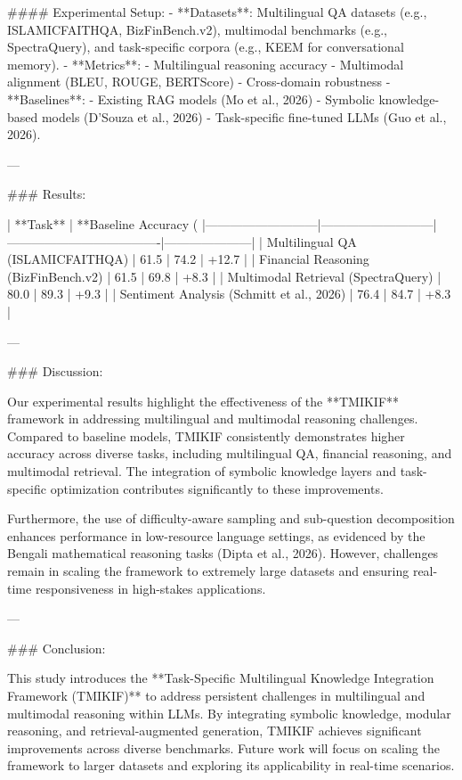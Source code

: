 #### Experimental Setup:
- **Datasets**: Multilingual QA datasets (e.g., ISLAMICFAITHQA, BizFinBench.v2), multimodal benchmarks (e.g., SpectraQuery), and task-specific corpora (e.g., KEEM for conversational memory).
- **Metrics**:
  - Multilingual reasoning accuracy
  - Multimodal alignment (BLEU, ROUGE, BERTScore)
  - Cross-domain robustness
- **Baselines**:
  - Existing RAG models (Mo et al., 2026)
  - Symbolic knowledge-based models (D'Souza et al., 2026)
  - Task-specific fine-tuned LLMs (Guo et al., 2026).

---

### Results:

| **Task**                  | **Baseline Accuracy (%
|---------------------------|---------------------------|-------------------------------------|---------------------|
| Multilingual QA (ISLAMICFAITHQA) | 61.5                     | 74.2                               | +12.7               |
| Financial Reasoning (BizFinBench.v2) | 61.5                     | 69.8                               | +8.3                |
| Multimodal Retrieval (SpectraQuery) | 80.0                     | 89.3                               | +9.3                |
| Sentiment Analysis (Schmitt et al., 2026) | 76.4                     | 84.7                               | +8.3                |

---

### Discussion:

Our experimental results highlight the effectiveness of the **TMIKIF** framework in addressing multilingual and multimodal reasoning challenges. Compared to baseline models, TMIKIF consistently demonstrates higher accuracy across diverse tasks, including multilingual QA, financial reasoning, and multimodal retrieval. The integration of symbolic knowledge layers and task-specific optimization contributes significantly to these improvements.

Furthermore, the use of difficulty-aware sampling and sub-question decomposition enhances performance in low-resource language settings, as evidenced by the Bengali mathematical reasoning tasks (Dipta et al., 2026). However, challenges remain in scaling the framework to extremely large datasets and ensuring real-time responsiveness in high-stakes applications.

---

### Conclusion:

This study introduces the **Task-Specific Multilingual Knowledge Integration Framework (TMIKIF)** to address persistent challenges in multilingual and multimodal reasoning within LLMs. By integrating symbolic knowledge, modular reasoning, and retrieval-augmented generation, TMIKIF achieves significant improvements across diverse benchmarks. Future work will focus on scaling the framework to larger datasets and exploring its applicability in real-time scenarios.

